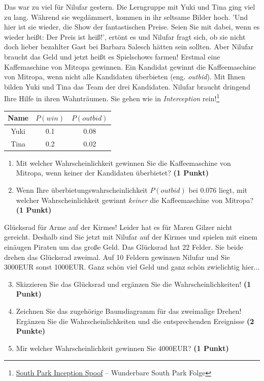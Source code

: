 \documentclass[a4paper, 9pt]{scrartcl}\usepackage[]{graphicx}\usepackage[]{xcolor}
\begin{document}
Das war zu viel für Nilufar gestern. Die Lerngruppe mit Yuki und Tina ging viel zu lang. Während sie wegdämmert, kommen in ihr seltsame Bilder hoch. 'Und hier ist sie wieder, die Show der fantastischen Preise. Seien Sie mit dabei, wenn es wieder heißt: Der Preis ist heiß!', ertönt es und Nilufar fragt sich, ob sie nicht doch lieber bezahlter Gast bei Barbara Salesch hätten sein sollten. Aber Nilufar braucht das Geld und jetzt heißt es Spielschows farmen! Erstmal eine Kaffemaschine von Mitropa gewinnen. Ein Kandidat gewinnt die Kaffeemaschine von Mitropa, wenn nicht alle Kandidaten überbieten (eng. \textit{outbid}). Mit Ihnen bilden Yuki und Tina das Team der drei Kandidaten. Nilufar braucht dringend Ihre Hilfe in ihren Wahnträumen. Sie gehen wie in \textit{Interception} rein!\footnote{\href{https://www.youtube.com/watch?v=3RhxyHMs-w8}{South Park Inception Spoof} -- Wunderbare South Park Folge}

\begin{center}
\begin{tabular}{ccc}
  \toprule
  Name & $P(win)$ & $P(outbid)$\\
  \midrule
  Yuki & 0.1 & 0.08\\
  Tina & 0.2 & 0.02 \\
  \bottomrule
\end{tabular}
\end{center}

\begin{enumerate}
\item Mit welcher Wahrscheinlichkeit gewinnen Sie die Kaffeemaschine von Mitropa, wenn keiner der Kandidaten überbietet? \textbf{(1 Punkt)}
\item Wenn Ihre überbietungswahrscheinlichkeit $P(outbid)$ bei 0.076 liegt, mit welcher Wahrscheinlichkeit gewinnt \textit{keiner} die Kaffeemaschine von Mitropa? \textbf{(1 Punkt)}
\end{enumerate}

Glücksrad für Arme auf der Kirmes! Leider hat es für Maren Gilzer nicht gereicht. Deshalb sind Sie jetzt mit Nilufar auf der Kirmes und spielen mit einem einäugen Piraten um das große Geld. Das Glücksrad hat 22 Felder. Sie beide drehen das Glücksrad zweimal. Auf 10 Feldern gewinnen Nilufar und Sie 3000EUR sonst 1000EUR. Ganz schön viel Geld und ganz schön zwielichtig hier...

\begin{enumerate}
  \setcounter{enumi}{2}  
\item Skizzieren Sie das Glücksrad und ergänzen Sie die Wahrscheinlichkeiten! \textbf{(1 Punkt)}
\item Zeichnen Sie das zugehörige Baumdiagramm für das zweimalige Drehen! Ergänzen Sie die Wahrscheinlichkeiten und die entsprechenden Ereignisse \textbf{(2 Punkte)}
\item Mir welcher Wahrscheinlichkeit gewinnen Sie 4000EUR? \textbf{(1 Punkt)}
\end{enumerate}
\end{document}
